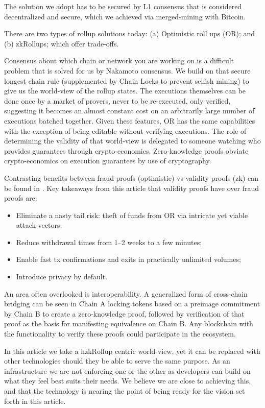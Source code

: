 \documentclass[peerreview]{ieeesyscoin}
\begin{document}
The solution we adopt has to be secured by L1 consensus that is considered decentralized and secure, which we achieved via merged-mining with Bitcoin.

There are two types of rollup solutions today: (a) Optimistic roll ups (OR); and (b) zkRollups; which offer trade-offs.

Consensus about which chain or network you are working on is a difficult problem that is solved for us by Nakamoto consensus. We build on that secure longest chain rule (supplemented by Chain Locks to prevent selfish mining) to give us the world-view of the rollup states. The executions themselves can be done once by a market of provers, never to be re-executed, only verified, suggesting it becomes an almost constant cost on an arbitrarily large number of executions batched together. Given these features, OR has the same capabilities with the exception of being editable without verifying executions. The role of determining the validity of that world-view is delegated to someone watching who provides guarantees through crypto-economics. Zero-knowledge proofs obviate crypto-economics on execution guarantees by use of cryptography.

Contrasting benefits between fraud proofs (optimistic) vs validity proofs (zk) can be found in \cite{Sta19}. Key takeaways from this article that validity proofs have over fraud proofs are:

\begin{itemize}
\item Eliminate a nasty tail risk: theft of funds from OR via intricate yet viable attack vectors;
\item Reduce withdrawal times from 1–2 weeks to a few minutes;
\item Enable fast tx confirmations and exits in practically unlimited volumes;
\item Introduce privacy by default.
\end{itemize}

An area often overlooked is interoperability. A generalized form of cross-chain bridging can be seen in Chain A locking tokens based on a preimage commitment by Chain B to create a zero-knowledge proof, followed by verification of that proof as the basis for manifesting equivalence on Chain B. Any blockchain with the functionality to verify these proofs could participate in the ecosystem.

In this article we take a hzkRollup centric world-view, yet it can be replaced with other technologies should they be able to serve the same purpose. As an infrastructure we are not enforcing one or the other as developers can build on what they feel best suits their needs. We believe we are close to achieving this, and that the technology is nearing the point of being ready for the vision set forth in this article.
\end{document}
